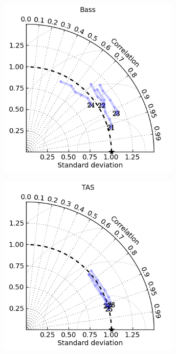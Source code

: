 \begin{figure}[H]
\begin{subfigure}{0.30\textwidth}
        \includegraphics[width=\textwidth]{figures/plots/taylor_diag_res_Bass.png}
        \caption{}
    \end{subfigure}
    \begin{subfigure}{0.30\textwidth}
          \includegraphics[width=\textwidth]{figures/plots/taylor_diag_res_TAS.png}

\end{subfigure}
\end{figure}
